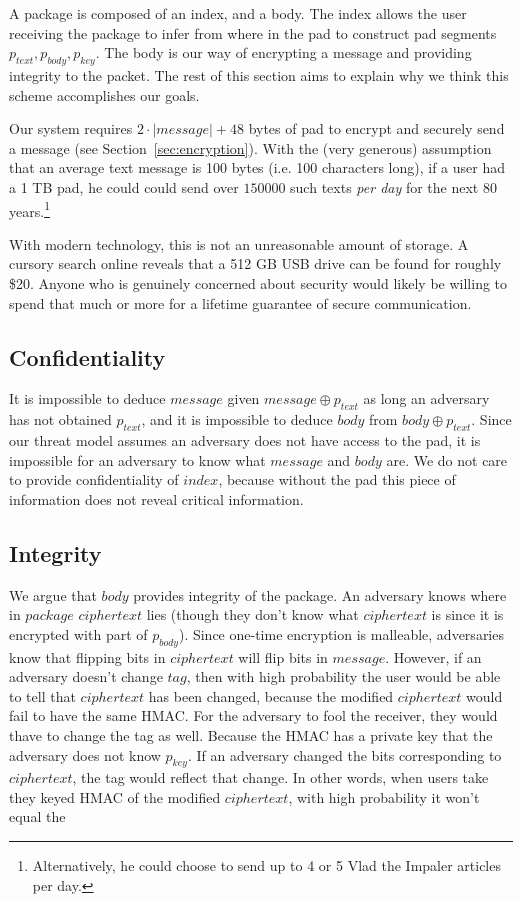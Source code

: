 \documentclass[twocolumn]{article}
\begin{document}
A package is composed of an index, and a body. The index allows the user receiving the package to infer from where in the pad to construct pad segments $p_{text}, p_{body}, p_{key}$. The body is our way of encrypting a message and providing integrity to the packet. The rest of this section aims to explain why we think this scheme accomplishes our goals.  

Our system requires $2\cdot |message| + 48$ bytes of pad to encrypt and securely send a message (see Section~\ref{sec:encryption}). With the (very generous) assumption that an average text message is 100 bytes (i.e. 100 characters long), if a user had a 1 TB pad, he could could send over $150000$ such texts \emph{per day} for the next 80 years.\footnote{
Alternatively, he could choose to send up to 4 or 5 Vlad the Impaler articles per day.
}

With modern technology, this is not an unreasonable amount of storage. A cursory search online reveals that a 512 GB USB drive can be found for roughly \$20. Anyone who is genuinely concerned about security would likely be willing to spend that much or more for a lifetime guarantee of secure communication.

\subsection{Confidentiality}
It is impossible to deduce $message$ given $message \oplus p_{text}$
as long an adversary has not obtained $p_{text}$, and it is impossible to deduce $body$ from $body \oplus p_{text}$. Since our threat model assumes an adversary does not have access to the pad, it is impossible for an adversary to know what $message$ and $body$ are. We do not care to provide confidentiality of $index$, because without the pad this piece of information does not reveal critical information. 

\subsection{Integrity}
We argue that $body$ provides integrity of the package. An adversary knows where in $package$ $ciphertext$ lies (though they don't know what $ciphertext$ is since it is encrypted with part of $p_{body}$). Since one-time encryption is malleable, adversaries know that flipping bits in $ciphertext$ will flip bits in $message$. However, if an adversary doesn't change $tag$, then with high probability the user would be able to tell that $ciphertext$ has been changed, because the modified $ciphertext$ would fail to have the same HMAC. For the adversary to fool the receiver, they would thave to change the tag as well. Because the HMAC has a private key that the adversary does not know $p_{key}$.
If an adversary changed the bits corresponding to $ciphertext$, the tag would reflect that change. In other words, when users take they keyed HMAC of the modified $ciphertext$, with high probability it won't equal the  
\end{document}
